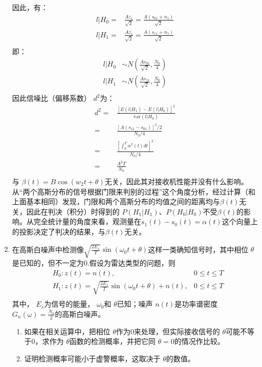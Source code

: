 \documentclass{article}
\begin{document}
\begin{enumerate}[1.]
因此，有： \[
	\begin{aligned}
	l|H_0=&\frac{Az_1}{\sqrt{2}}=\frac{A(s_{01}+n_1)}{\sqrt{2}}\\
	l|H_1=&\frac{Az_1}{\sqrt{2}}=\frac{A(s_{11}+n_1)}{\sqrt{2}}\\
	\end{aligned}
\]
即： \[
	\begin{aligned}
	l|H_0& \sim N\left( \frac{As_{01}}{\sqrt{2}},\frac{N_0}{4} \right)\\
	l|H_1& \sim N\left( \frac{As_{11}}{\sqrt{2}},\frac{N_0}{4} \right)\\
	\end{aligned}
\]
因此信噪比（偏移系数） $ d^2 $为： \[
	\begin{aligned}
	d^2=&\frac{[E(l|H_1)-E(l|H_0)]^2}{\text{var}(l|H_0)}\\
	   =&\frac{[A(s_{11}-s_{01})]^2/2}{N_0/4}\\
	   =&\frac{[\int_0^T\alpha^2(t)dt]^2}{N_0/4}\\
	   =&\frac{A^2T}{N_0}\\
	\end{aligned}
\]
与 $ \beta(t)=B\cos(w_2t+\theta) $无关，因此其对接收机性能并没有什么影响。
\\

从“两个高斯分布的信号根据门限来判别的过程”这个角度分析，经过计算（和上面基本相同）发现，门限和两个高斯分布的均值之间的距离均与$ \beta(t) $无关，因此在判决（积分）时得到的 $ P(H_1|H_1)、P(H_0|H_0) $不受$ \beta(t) $的影响。从完全统计量的角度来看，观测量在$ s_1(t)-s_0(t)=\alpha(t) $这个向量上的投影决定了判决的结果，与$ \beta(t) $无关。


\item
在高斯白噪声中检测像$ \sqrt{\frac{2E_s}{T}}\sin (\omega_0t+\theta) $这样一类确知信号时，其中相位 $ \theta $是已知的，但不一定为0.假设为雷达类型的问题，则 \[
	\begin{aligned}
	&H_0:z(t)=n(t),& 0\le t\le T\\
	&H_1:z(t)=\sqrt{\frac{2E_s}{T}}\sin(\omega_0t+\theta)+n(t),&0\le t\le T\\
	\end{aligned}
\]
其中， $ E_s $为信号的能量， $ \omega_0 $和 $ \theta $已知；噪声 $ n(t) $是功率谱密度 $ G_n(\omega)=\frac{N_0}{2} $的高斯白噪声。

\begin{enumerate}[(1)]
\item
如果在相关运算中，把相位 $ \theta $作为0来处理，但实际接收信号的 $ \theta $可能不等于0，求作为 $ \theta $函数的检测概率，并把它同 $ \theta=0 $的情况作比较。
\item
证明检测概率可能小于虚警概率，这取决于 $ \theta $的数值。
\end{enumerate}


\end{enumerate}
\end{document}
